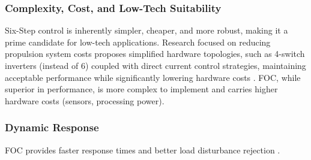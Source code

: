 \subsubsection{Complexity, Cost, and Low-Tech Suitability}
Six-Step control is inherently simpler, cheaper, and more robust, making it a prime candidate for low-tech applications. Research focused on reducing propulsion system costs proposes simplified hardware topologies, such as 4-switch inverters (instead of 6) coupled with direct current control strategies, maintaining acceptable performance while significantly lowering hardware costs \cite{lee_advanced_2001}. FOC, while superior in performance, is more complex to implement and carries higher hardware costs (sensors, processing power).

\subsubsection{Dynamic Response}
FOC provides faster response times and better load disturbance rejection \cite{jomsa-nga_torque_2024}.
